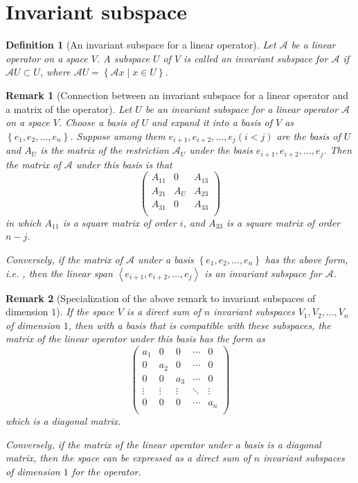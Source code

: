 \documentclass[onecolumn]{ctexart}
\newtheorem{definition}{Definition}
\newtheorem{remark}{Remark}
\begin{document}
\section{Invariant subspace}
\begin{definition}[An invariant subspace for a linear operator]
  Let $\mathcal{A}$ be a linear operator on a space $V$. A subspace $U$ of $V$ 
  is called an invariant subspace for $\mathcal{A}$ if $\mathcal{A}U \subset U$, 
  where $\mathcal{A}U = \left\{ \mathcal{A}x \mid x \in U \right\}$.
\end{definition}

\begin{remark}[Connection between an invariant subspace for a linear operator and a matrix of the operator]
  Let $U$ be an invariant subspace for a linear operator $\mathcal{A}$ on a 
  space $V$. Choose a basis of $U$ and expand it into a basis of $V$ as $\left\{ 
  e_1, e_2, \ldots, e_n \right\}$. Suppose among them $e_{i+1}, e_{i+2}, \ldots, 
  e_j (i < j)$ are the basis of $U$ and $A_U$ is the matrix of the restriction 
  $\mathcal{A}_U$ under the basis $e_{i+1}, e_{i+2}, \ldots, e_j$. Then the 
  matrix of $\mathcal{A}$ under this basis is that
  \[
    \begin{pmatrix}
      A_{11} & 0 & A_{13} \\
      A_{21} & A_U & A_{23} \\
      A_{31} & 0 & A_{33} \\
    \end{pmatrix}
  \]
  in which $A_{11}$ is a square matrix of order $i$, and $A_{33}$ is a square matrix of order $n - j$.

  Conversely, if the matrix of $\mathcal{A}$ under a basis $\left\{e_1, e_2, 
  \ldots, e_n \right\}$ has the above form, i.e. , then the linear span 
  $\left\langle e_{i+1}, e_{i+2}, \ldots, e_j \right\rangle$ is an invariant 
  subspace for $\mathcal{A}$.
\end{remark}

\begin{remark}[Specialization of the above remark to invariant subspaces of dimension $1$]
  If the space $V$ is a direct sum of $n$ invariant subspaces $V_1, V_2, \ldots, V_n$ of dimension $1$, then with a basis that is compatible with these subspaces, the matrix of the linear operator under this basis has the form as
  \[
    \begin{pmatrix}
      a_1 & 0 & 0 & \cdots & 0 \\
      0 & a_2 & 0 & \cdots & 0 \\
      0 & 0 & a_3 & \cdots & 0 \\
      \vdots & \vdots & \vdots & \ddots & \vdots \\
      0 & 0 & 0 & \cdots & a_n \\
    \end{pmatrix}
  \]
  which is a diagonal matrix.

  Conversely, if the matrix of the linear operator under a basis is a diagonal 
  matrix, then the space can be expressed as a direct sum of $n$ invariant 
  subspaces of dimension $1$ for the operator.
\end{remark}
\end{document}
